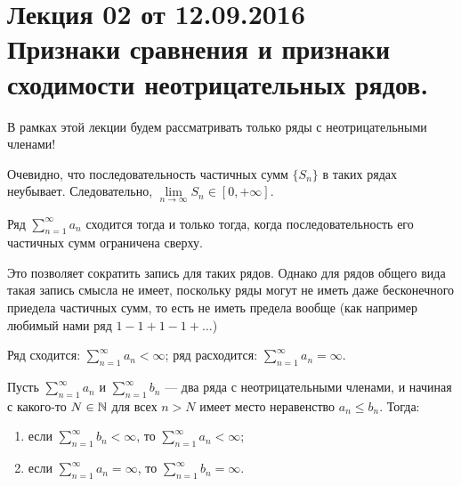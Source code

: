 \documentclass[a4paper, 12pt]{article}
\begin{document}
\pagestyle{fancy}
\section{Лекция 02 от 12.09.2016 \\Признаки сравнения и признаки сходимости неотрицательных рядов.}

В рамках этой лекции будем рассматривать только ряды с неотрицательными членами!

Очевидно, что последовательность частичных сумм $\{S_n \}$ в таких рядах неубывает. Следовательно, $\lim\limits_{n\rightarrow \infty}S_n \in [0, +\infty]$.

\begin{Statement}
	Ряд $\sum\limits_{n=1}^{\infty} a_n$ сходится тогда и только тогда, когда последовательность его частичных сумм ограничена сверху.
\end{Statement}

Это позволяет сократить запись для таких рядов. Однако для рядов общего вида такая запись смысла не имеет, поскольку ряды могут не иметь даже бесконечного приедела частичных сумм, то есть не иметь предела вообще (как например любимый нами ряд $1 - 1 + 1 - 1 + \ldots$)
\begin{Designation} Ряд сходится: $\sum\limits_{n=1}^{\infty} a_n < \infty$; ряд расходится: $\sum\limits_{n=1}^{\infty} a_n = \infty$.
\end{Designation}

\begin{Test}
	Пусть $\sum\limits_{n=1}^{\infty} a_n$ и $\sum\limits_{n=1}^{\infty} b_n$ --- два ряда с неотрицательными членами, и начиная с какого-то $N\in \mathbb{N}$ для всех $n > N$ имеет место неравенство $a_n \le b_n$. Тогда:
	\begin{enumerate}
	\item если $\sum\limits_{n=1}^{\infty} b_n < \infty$, то $\sum\limits_{n=1}^{\infty} a_n < \infty$;
	\item если $\sum\limits_{n=1}^{\infty} a_n = \infty$, то $\sum\limits_{n=1}^{\infty} b_n = \infty$.
	\end{enumerate}
\end{Test}
\end{document}
